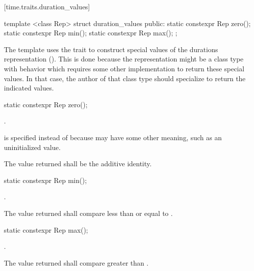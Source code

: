 [time.traits.duration_values]{}

%
\begin{itemdecl}
template <class Rep>
struct duration_values {
public:
  static constexpr Rep zero();
  static constexpr Rep min();
  static constexpr Rep max();
};
\end{itemdecl}

\pnum
The  template uses the  trait to
construct special values of the durations representation (). This is
done because the representation might be a class type with behavior which
requires some other implementation to return these special values. In that case,
the author of that class type should specialize  to
return the indicated values.

%
\begin{itemdecl}
static constexpr Rep zero();
\end{itemdecl}

\begin{itemdescr}
\pnum
\returns {}. \begin{note}  is specified instead of
 because  may have some other meaning, such as an
uninitialized value. \end{note}

\pnum
\remark The value returned shall be the additive identity.
\end{itemdescr}

%
\begin{itemdecl}
static constexpr Rep min();
\end{itemdecl}

\begin{itemdescr}
\pnum
\returns {}.

\pnum
\remark The value returned shall compare less than or equal to .
\end{itemdescr}

%
\begin{itemdecl}
static constexpr Rep max();
\end{itemdecl}

\begin{itemdescr}
\pnum
\returns {}.

\pnum
\remark The value returned shall compare greater than .
\end{itemdescr}

